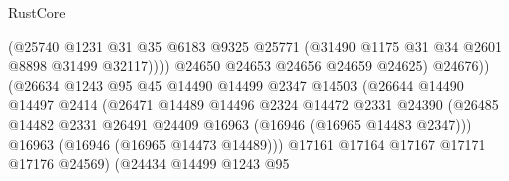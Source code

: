 \begin{lexlean}{RustCore}
\begin{coremodule}
                                              (@25740
                                                @1231
                                                @31
                                                @35
                                                @6183
                                                @9325
                                                @25771
                                                (@31490 @1175 @31 @34 @2601 @8898 @31499 @32117))))
                                          @24650
                                          @24653
                                          @24656
                                          @24659
                                          @24625)
                                        @24676))
                                    (@26634
                                      @1243
                                      @95
                                      @45
                                      @14490
                                      @14499
                                      @2347
                                      @14503
                                      (@26644
                                        @14490
                                        @14497
                                        @2414
                                        (@26471
                                          @14489
                                          @14496
                                          @2324
                                          @14472
                                          @2331
                                          @24390
                                          (@26485
                                            @14482
                                            @2331
                                            @26491
                                            @24409
                                            @16963
                                            (@16946 (@16965 @14483 @2347)))
                                          @16963
                                          (@16946 (@16965 @14473 @14489)))
                                        @17161
                                        @17164
                                        @17167
                                        @17171
                                        @17176
                                        @24569)
                                      (@24434
                                        @14499
                                        @1243
                                        @95

\end{coremodule}
\end{lexlean}
